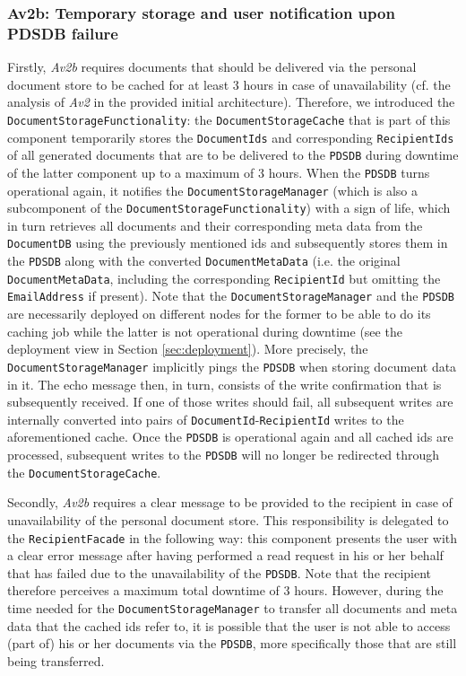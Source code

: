 \documentclass[a4paper,10pt]{article}
\begin{document}
\subsubsection{Av2b: Temporary storage and user notification upon PDSDB failure}\label{subsubsec:Av2b}
Firstly, \textit{Av2b} requires documents that should be delivered via the personal document store to be cached for at least 3 hours in case of unavailability (cf. the analysis of \textit{Av2} in the provided initial architecture). Therefore, we introduced the \texttt{DocumentStorageFunctionality}: the \texttt{DocumentStorageCache} that is part of this component temporarily stores the \texttt{DocumentIds} and corresponding \texttt{RecipientIds} of all generated documents that are to be delivered to the \texttt{PDSDB} during downtime of the latter component up to a maximum of 3 hours. When the \texttt{PDSDB} turns operational again, it notifies the \texttt{DocumentStorageManager} (which is also a subcomponent of the \texttt{DocumentStorageFunctionality}) with a sign of life, which in turn retrieves all documents and their corresponding meta data from the \texttt{DocumentDB} using the previously mentioned ids and subsequently stores them in the \texttt{PDSDB} along with the converted \texttt{DocumentMetaData} (i.e. the original \texttt{DocumentMetaData}, including the corresponding \texttt{RecipientId} but omitting the \texttt{EmailAddress} if present). Note that the \texttt{DocumentStorageManager} and the \texttt{PDSDB} are necessarily deployed on different nodes for the former to be able to do its caching job while the latter is not operational during downtime (see the deployment view in Section \ref{sec:deployment}). More precisely, the \texttt{DocumentStorageManager} implicitly pings the \texttt{PDSDB} when storing document data in it. The echo message then, in turn, consists of the write confirmation that is subsequently received. If one of those writes should fail, all subsequent writes are internally converted into pairs of \texttt{DocumentId}-\texttt{RecipientId} writes to the aforementioned cache. Once the \texttt{PDSDB} is operational again and all cached ids are processed, subsequent writes to the \texttt{PDSDB} will no longer be redirected through the \texttt{DocumentStorageCache}.

Secondly, \textit{Av2b} requires a clear message to be provided to the recipient in case of unavailability of the personal document store. This responsibility is delegated to the \texttt{RecipientFacade} in the following way: this component presents the user with a clear error message after having performed a read request in his or her behalf that has failed due to the unavailability of the \texttt{PDSDB}. Note that the recipient therefore perceives a maximum total downtime of 3 hours. However, during the time needed for the \texttt{DocumentStorageManager} to transfer all documents and meta data that the cached ids refer to, it is possible that the user is not able to access (part of) his or her documents via the \texttt{PDSDB}, more specifically those that are still being transferred.
\end{document}
